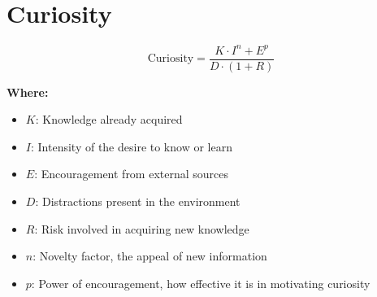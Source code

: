 \chapter{Curiosity}

\begin{equation}
\text{Curiosity} = \frac{K \cdot I^n + E^p}{D \cdot (1 + R)}
\end{equation}

\textbf{Where:}

\begin{itemize}
    \item $K$: Knowledge already acquired
    \item $I$: Intensity of the desire to know or learn
    \item $E$: Encouragement from external sources
    \item $D$: Distractions present in the environment
    \item $R$: Risk involved in acquiring new knowledge
    \item $n$: Novelty factor, the appeal of new information
    \item $p$: Power of encouragement, how effective it is in motivating curiosity
\end{itemize}